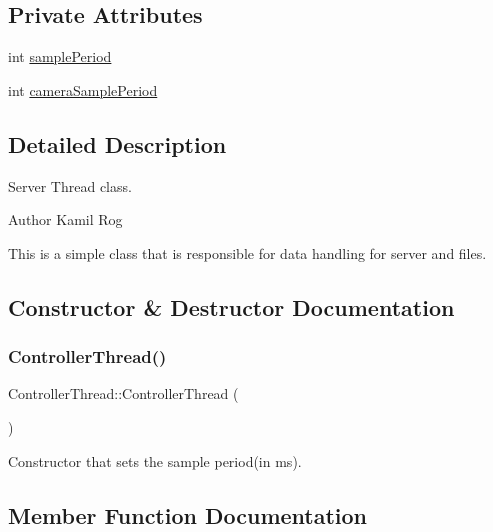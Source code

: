 \subsection*{Private Attributes}
\begin{DoxyCompactItemize}
\item 
int \hyperlink{classControllerThread_a5dcd0069c7d31295c7e1e598c31fadf7}{sample\+Period}
\item 
int \hyperlink{classControllerThread_af7ff15f765bb001fbb647515761173cd}{camera\+Sample\+Period}
\end{DoxyCompactItemize}


\subsection{Detailed Description}
Server Thread class. 

\begin{DoxyAuthor}{Author}
Kamil Rog
\end{DoxyAuthor}
This is a simple class that is responsible for data handling for server and files. 

\subsection{Constructor \& Destructor Documentation}
\mbox{\label{classControllerThread_a00cd6502504f5f1e680e6be3f60a987d}} 
\subsubsection{\texorpdfstring{Controller\+Thread()}{ControllerThread()}}
{\footnotesize\ttfamily Controller\+Thread\+::\+Controller\+Thread (\begin{DoxyParamCaption}{ }\end{DoxyParamCaption})\hspace{0.3cm}{\ttfamily [inline]}}

Constructor that sets the sample period(in ms). 

\subsection{Member Function Documentation}
\mbox{\label{classCppThread_a8ff0fda6b913cc53764caef0e1200f3f}} 

